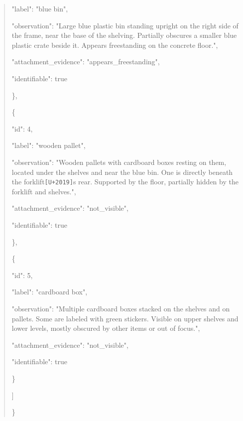 \documentclass[10pt,a4paper]{article}
\begin{document}
\begin{quote}
      "label":\allowbreak{} "blue bin",\allowbreak{}\par
      "observation":\allowbreak{} "Large blue plastic bin standing upright on the right side of the frame,\allowbreak{} near the base of the shelving. Partially obscures a smaller blue plastic crate beside it. Appears freestanding on the concrete floor.",\allowbreak{}\par
      "attachment\_evidence":\allowbreak{} "appears\_freestanding",\allowbreak{}\par
      "identifiable":\allowbreak{} true\par
    \},\allowbreak{}\par
    \{\par
      "id":\allowbreak{} 4,\allowbreak{}\par
      "label":\allowbreak{} "wooden pallet",\allowbreak{}\par
      "observation":\allowbreak{} "Wooden pallets with cardboard boxes resting on them,\allowbreak{} located under the shelves and near the blue bin. One is directly beneath the forklift\texttt{[U+2019]}s rear. Supported by the floor,\allowbreak{} partially hidden by the forklift and shelves.",\allowbreak{}\par
      "attachment\_evidence":\allowbreak{} "not\_visible",\allowbreak{}\par
      "identifiable":\allowbreak{} true\par
    \},\allowbreak{}\par
    \{\par
      "id":\allowbreak{} 5,\allowbreak{}\par
      "label":\allowbreak{} "cardboard box",\allowbreak{}\par
      "observation":\allowbreak{} "Multiple cardboard boxes stacked on the shelves and on pallets. Some are labeled with green stickers. Visible on upper shelves and lower levels,\allowbreak{} mostly obscured by other items or out of focus.",\allowbreak{}\par
      "attachment\_evidence":\allowbreak{} "not\_visible",\allowbreak{}\par
      "identifiable":\allowbreak{} true\par
    \}\par
  ]\par
\}
\end{quote}
\end{document}
